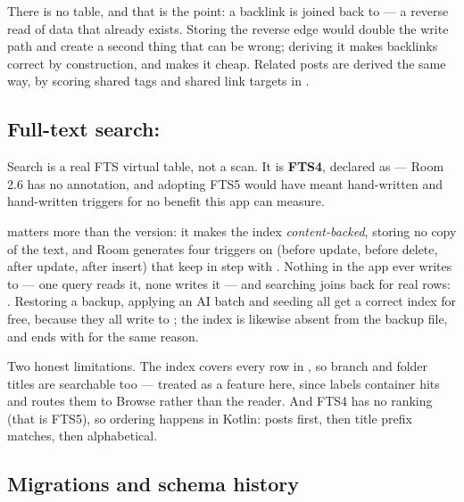 \medskip

There is no  table, and that is the point: a backlink is
 joined back to  --- a reverse
read of data that already exists. Storing the reverse edge would double the write path and create a
second thing that can be wrong; deriving it makes backlinks correct by construction, and
 makes it cheap. Related posts are derived the same way, by scoring
shared tags and shared link targets in .

\subsection{Full-text search: }

Search is a real FTS virtual table, not a  scan. It is \textbf{FTS4}, declared as
 --- Room 2.6 has no  annotation, and adopting
FTS5 would have meant hand-written  and hand-written triggers for no
benefit this app can measure.

 matters more than the version: it makes the index \emph{content-backed}, storing
no copy of the text, and Room generates four triggers on  (before update, before delete,
after update, after insert) that keep  in step with . Nothing in the app
ever writes to  --- one query reads it, none writes it --- and searching joins back
for real rows: . Restoring a backup, applying an AI batch and seeding all get a
correct index for free, because they all write to ; the index is likewise absent from the
backup file, and  ends with
 for the same reason.

Two honest limitations. The index covers every row in , so branch and folder titles are
searchable too --- treated as a feature here, since  labels container hits and
routes them to Browse rather than the reader. And FTS4 has no  ranking (that is FTS5), so
ordering happens in Kotlin: posts first, then title prefix matches, then alphabetical.

\subsection{Migrations and schema history}

